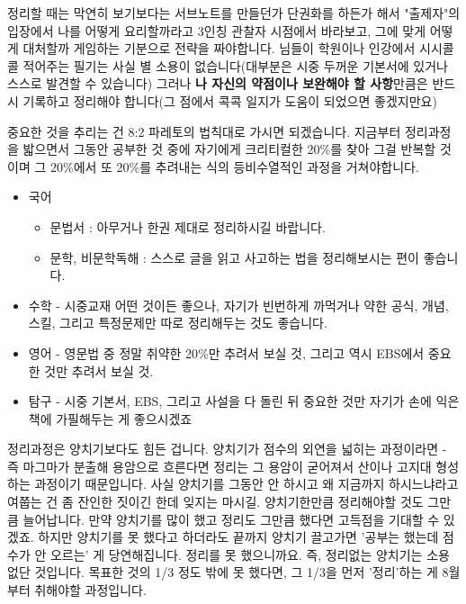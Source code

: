 정리할 때는 막연히 보기보다는 서브노트를 만들던가 단권화를 하든가 해서
"출제자"의 입장에서 나를 어떻게 요리할까라고 3인칭 관찰자 시점에서 바라보고, 그에 맞게 어떻게 대처할까 게임하는 기분으로 전략을 짜야합니다.
님들이 학원이나 인강에서 시시콜콜 적어주는 필기는 사실 별 소용이 없습니다(대부분은 시중 두꺼운 기본서에 있거나 스스로 발견할 수 있습니다)
그러나 \textbf{나 자신의 약점이나 보완해야 할 사항}만큼은 반드시 기록하고 정리해야 합니다(그 점에서 콕콕 일지가 도움이 되었으면 좋겠지만요)
\vspace{5mm}

중요한 것을 추리는 건 8:2 파레토의 법칙대로 가시면 되겠습니다.
지금부터 정리과정을 밟으면서 그동안 공부한 것 중에 자기에게 크리티컬한 20$\%$를 찾아 그걸 반복할 것이며
그 20$\%$에서 또 20$\%$를 추려내는 식의 등비수열적인 과정을 거쳐야합니다.
\vspace{5mm}

\begin{itemize}
    \item 국어 
    \begin{itemize}
        \item 문법서 : 아무거나 한권 제대로 정리하시길 바랍니다.
        \item 문학, 비문학독해 : 스스로 글을 읽고 사고하는 법을 정리해보시는 편이 좋습니다.
    \end{itemize}
    
    
    \item 수학 - 시중교재 어떤 것이든 좋으나, 자기가 빈번하게 까먹거나 약한 공식, 개념, 스킬, 그리고 특정문제만 따로 정리해두는 것도 좋습니다.
    \vspace{5mm}
    
    \item  영어 - 영문법 중 정말 취약한 20$\%$만 추려서 보실 것, 그리고 역시 EBS에서 중요한 것만 추려서 보실 것.
    \vspace{5mm}
    
    \item 탐구 - 시중 기본서, EBS, 그리고 사설을 다 돌린 뒤 중요한 것만 자기가 손에 익은 책에 가필해두는 게 좋으시겠죠
    \vspace{5mm}
\end{itemize}

정리과정은 양치기보다도 힘든 겁니다. 양치기가 점수의 외연을 넓히는 과정이라면 - 즉 마그마가 분출해 용암으로 흐른다면
정리는 그 용암이 굳어져서 산이나 고지대 형성하는 과정이기 때문입니다.
사실 양치기를 그동안 안 하시고 왜 지금까지 하시느냐라고 여쭙는 건 좀 잔인한 짓이긴 한데 잊지는 마시길.
양치기한만큼 정리해야할 것도 그만큼 늘어납니다.
만약 양치기를 많이 했고 정리도 그만큼 했다면 고득점을 기대할 수 있겠죠.
하지만 양치기를 못 했다고 하더라도 끝까지 양치기 끌고가면 '공부는 했는데 점수가 안 오르는' 게 당연해집니다. 정리를 못 했으니까요.
즉, 정리없는 양치기는 소용없단 것입니다. 목표한 것의 1/3 정도 밖에 못 했다면, 그 1/3을 먼저 '정리'하는 게 8월부터 취해야할 과정입니다.
\vspace{5mm}

